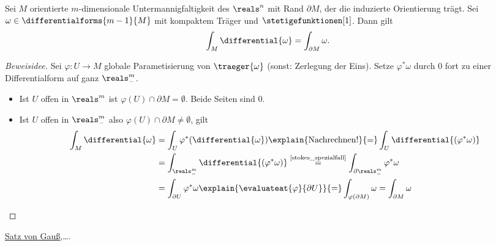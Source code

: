 \begin{satz} \label{integralsatz_stokes}
  Sei \( M \) orientierte \( m \)-dimensionale Untermannigfaltigkeit des \( \reals^n \) mit Rand \( \partial M \), der die induzierte Orientierung trägt.
  Sei \( \omega\in\differentialforms{m-1}{M} \) mit kompaktem Träger und \( \stetigefunktionen[1] \). Dann gilt 
  \begin{equation*}
      \int_M\differential{\omega}=\int_{\partial M}\omega.
  \end{equation*}
\end{satz}

\begin{proof}[Beweisidee]
  Sei \( \varphi\colon U\to M \) globale Parametisierung von \( \traeger{\omega} \) (sonst: Zerlegung der Eins).
  Setze \( \varphi^*\omega \) durch 0 fort zu einer Differentialform auf ganz \( \reals_-^m \).
  \begin{itemize}
      \item Ist \( U \) offen in \( \reals^m \) ist \( \varphi(U)\cap \partial M=\emptyset \). Beide Seiten sind 0.
      \item Ist \( U \) offen in \( \reals_-^m \) also \( \varphi(U)\cap \partial M\neq\emptyset \), gilt 
      \begin{align*}
          \int_M\differential{\omega} &= \int_U\varphi^*(\differential{\omega})\explain{\text{Nachrechnen!}}{=}\int_U\differential{(\varphi^*\omega)}\\
          &= \int_{\reals_-^m}\differential{(\varphi^*\omega)} \overset{\text{\ref{stokes_spezialfall}}}{=}\int_{\partial\reals_-^m}\varphi^*\omega\\
          &= \int_{\partial U}\varphi^*\omega\explain{\evaluateat{\varphi}{\partial U}}{=}\int_{\varphi(\partial M)}\omega=\int_{\partial M}\omega
      \end{align*}
  \end{itemize}
\end{proof}

\begin{beispiel*}
  \hyperref[integralsatz_gauss]{Satz von Gauß},\dots.
\end{beispiel*}


